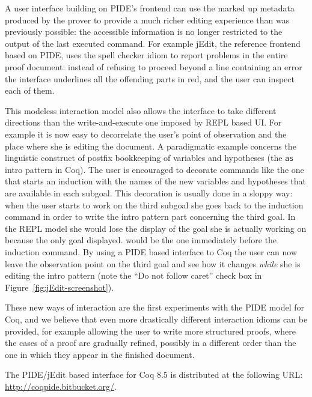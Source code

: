 \documentclass[runningheads,a4paper,oribibl]{llncs}
\begin{document}
A user interface building on PIDE's frontend can use the marked up
metadata produced by the prover to provide a much richer editing
experience than was previously possible: the accessible information is no
longer restricted to
the output of
the last executed command.
For example jEdit, the reference frontend based on PIDE,
uses the spell checker idiom to report problems in the entire proof
document: instead of refusing to proceed beyond a line containing an
error the interface underlines all the offending parts in red, and the
user can inspect each of them.

This modeless interaction model also allows the interface to take
different directions than the write-and-execute one imposed by REPL
based UI.  For example it is now easy to decorrelate the user's point
of observation and the place where she is editing the document.  A
paradigmatic example concerns the linguistic construct of postfix
bookkeeping of variables and hypotheses (the \lstinline{as} intro
pattern in Coq).  The user is encouraged to decorate commands like the one
that starts an induction with the names of the new variables and
hypotheses that are available in each subgoal.  This decoration is
usually done in a sloppy way: when the user starts to work
on the third subgoal she goes back to the induction command in order
to write the intro pattern part concerning the third goal.  In the
REPL model she would lose the display of the goal she is actually working
on because the only goal displayed.
would be the one immediately
before the induction command.  By using a PIDE based interface to Coq
the user can now leave the observation point on the third goal and see
how it changes \emph{while} she is editing the intro pattern (note the
``Do not follow caret'' check box in
Figure~\ref{fig:jEdit-screenshot}).

These new ways of interaction are the first experiments with the PIDE
model for Coq, and we believe that even more drastically different
interaction idioms can be provided, for example allowing the user to
write more structured proofs, where the cases of a proof are gradually
refined, possibly in a different order than the one in which they
appear in the finished document. 

The PIDE/jEdit based interface for Coq 8.5 is distributed at the
following URL: \url{http://coqpide.bitbucket.org/}.
\end{document}
